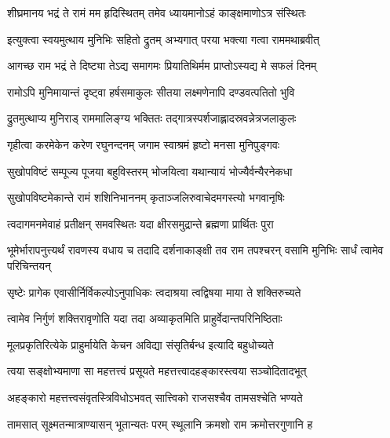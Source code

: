 


\addtocounter{shlokacount}{9}

\twolineshloka
{शीघ्रमानय भद्रं ते रामं मम हृदिस्थितम्}
{तमेव ध्यायमानोऽहं काङ्क्षमाणोऽत्र संस्थितः} %

\twolineshloka
{इत्युक्त्वा स्वयमुत्थाय मुनिभिः सहितो द्रुतम्}
{अभ्यगात् परया भक्त्या गत्वा राममथाब्रवीत्} %

\twolineshloka
{आगच्छ राम भद्रं ते दिष्ट्या तेऽद्य समागमः}
{प्रियातिथिर्मम प्राप्तोऽस्यद्य मे सफलं दिनम्} %

\twolineshloka
{रामोऽपि मुनिमायान्तं दृष्ट्वा हर्षसमाकुलः}
{सीतया लक्ष्मणेनापि दण्डवत्पतितो भुवि} %

\twolineshloka
{द्रुतमुत्थाप्य मुनिराड् राममालिङ्ग्य भक्तितः}
{तद्गात्रस्पर्शजाह्लादस्रवन्नेत्रजलाकुलः} %

\twolineshloka
{गृहीत्वा करमेकेन करेण रघुनन्दनम्}
{जगाम स्वाश्रमं हृष्टो मनसा मुनिपुङ्गवः} %

\twolineshloka
{सुखोपविष्टं सम्पूज्य पूजया बहुविस्तरम्}
{भोजयित्वा यथान्यायं भोज्यैर्वन्यैरनेकधा} %

\twolineshloka
{सुखोपविष्टमेकान्ते रामं शशिनिभाननम्}
{कृताञ्जलिरुवाचेदमगस्त्यो भगवानृषिः} %

\twolineshloka
{त्वदागमनमेवाहं प्रतीक्षन् समवस्थितः}
{यदा क्षीरसमुद्रान्ते ब्रह्मणा प्रार्थितः पुरा} %

\threelineshloka
{भूमेर्भारापनुत्त्यर्थं रावणस्य वधाय च}
{तदादि दर्शनाकाङ्क्षी तव राम तपश्चरन्}
{वसामि मुनिभिः सार्धं त्वामेव परिचिन्तयन्} %

\twolineshloka
{सृष्टेः प्रागेक एवासीर्निर्विकल्पोऽनुपाधिकः}
{त्वदाश्रया त्वद्विषया माया ते शक्तिरुच्यते} %

\twolineshloka
{त्वामेव निर्गुणं शक्तिरावृणोति यदा तदा}
{अव्याकृतमिति प्राहुर्वेदान्तपरिनिष्ठिताः} %

\twolineshloka
{मूलप्रकृतिरित्येके प्राहुर्मायेति केचन}
{अविद्या संसृतिर्बन्ध इत्यादि बहुधोच्यते} %

\twolineshloka
{त्वया सङ्क्षोभ्यमाणा सा महत्तत्त्वं प्रसूयते}
{महत्तत्त्वादहङ्कारस्त्वया सञ्चोदितादभूत्} %

\twolineshloka
{अहङ्कारो महत्तत्त्वसंवृतस्त्रिविधोऽभवत्}
{सात्त्विको राजसश्चैव तामसश्चेति भण्यते} %

\twolineshloka
{तामसात् सूक्ष्मतन्मात्राण्यासन् भूतान्यतः परम्}
{स्थूलानि क्रमशो राम क्रमोत्तरगुणानि ह} %

